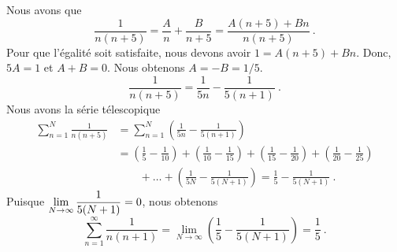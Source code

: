 { Nous avons que
\[
\frac{1}{n(n+5)} = \frac{A}{n} + \frac{B}{n+5} = \frac{A(n+5) + Bn}{n(n+5)} \ .
\]
Pour que l'égalité soit satisfaite, nous devons avoir
$1 = A(n+5) + Bn$.  Donc, $5A=1$ et $A+B = 0$.  Nous obtenons
$A = -B = 1/5$.
\[
\frac{1}{n(n+5)} = \frac{1}{5n} - \frac{1}{5(n+1)} \ .
\]
Nous avons la série télescopique
\begin{align*}
\sum_{n=1}^N \frac{1}{n(n+5)}
&= \sum_{n=1}^N \left(\frac{1}{5n} - \frac{1}{5(n+1)}\right) \\
&= \left(\frac{1}{5} - \frac{1}{10}\right)
+ \left(\frac{1}{10} - \frac{1}{15}\right)
+ \left(\frac{1}{15} - \frac{1}{20}\right)
+ \left(\frac{1}{20} - \frac{1}{25}\right) \\
& \qquad + \ldots + \left(\frac{1}{5N} - \frac{1}{5(N+1)}\right)
= \frac{1}{5} - \frac{1}{5(N+1)} \ .
\end{align*}
Puisque $\displaystyle \lim_{N\to \infty}\frac{1}{5(N+1)} = 0$, nous
obtenons
\[
  \sum_{n=1}^\infty \frac{1}{n(n+1)} =
\lim_{N\to \infty}\left( \frac{1}{5} - \frac{1}{5(N+1)}\right) =  \frac{1}{5} \ .
\]
}


